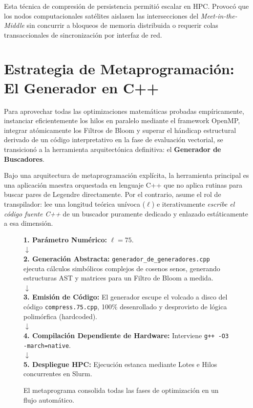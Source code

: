 \documentclass[12pt,a4paper]{tfg_domingo}
\begin{document}
Esta técnica de compresión de persistencia permitió escalar en
HPC. Provocó que los nodos computacionales satélites aislasen las
intersecciones del \emph{Meet-in-the-Middle} sin concurrir a bloqueos
de memoria distribuida o requerir colas transaccionales de
sincronización por interfaz de red. 

\section{Estrategia de Metaprogramación: El Generador en C++}

Para aprovechar todas las optimizaciones matemáticas probadas
empíricamente, instanciar eficientemente los hilos en paralelo
mediante el framework OpenMP, integrar atómicamente los Filtros de
Bloom y superar el hándicap estructural derivado de un código
interpretativo en la fase de evaluación vectorial, se transicionó a la
herramienta arquitectónica definitiva: el \textbf{Generador de
  Buscadores}. 

Bajo una arquitectura de metaprogramación explícita, la herramienta
principal es una aplicación maestra orquestada en lenguaje C++ que no
aplica rutinas para buscar pares de Legendre 
directamente. Por el contrario, asume el rol de transpilador: lee una
longitud teórica unívoca ($\ell$) e iterativamente \emph{escribe el
  código fuente C++} de un buscador puramente dedicado y enlazado
estáticamente a esa dimensión. 

\begin{figure}[htb!]
    \centering
    \begin{tcolorbox}[colback=blue!5!white,colframe=blue!75!black,title=Flujo de Transpilación y Metaprogramación]
    \centering
    \textbf{1. Parámetro Numérico:} $\ell=75$. \\
    $\downarrow$ \\
    \textbf{2. Generación Abstracta:} \texttt{generador\_de\_generadores.cpp} ejecuta cálculos simbólicos complejos de cosenos senos, generando estructuras AST y matrices para un Filtro de Bloom a medida. \\
    $\downarrow$ \\
    \textbf{3. Emisión de Código:} El generador escupe el volcado a disco del código \texttt{compress.75.cpp}, 100\% desenrollado y desprovisto de lógica polimórfica (hardcoded). \\
    $\downarrow$ \\
    \textbf{4. Compilación Dependiente de Hardware:} Interviene \texttt{g++ -O3 -march=native}. \\
    $\downarrow$ \\
    \textbf{5. Despliegue HPC:} Ejecución estanca mediante Lotes e Hilos concurrentes en Slurm.
    \end{tcolorbox}
    \caption{El metaprograma consolida todas las fases de optimización en un flujo automático.}
    \label{fig:workflow_diagram_2}
\end{figure}
\end{document}
